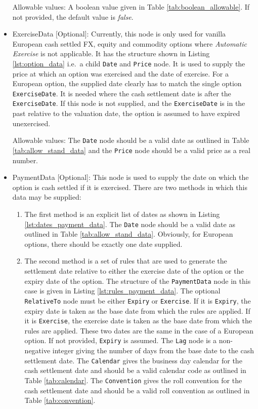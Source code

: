 \begin{itemize}
Allowable values: A boolean value given in Table \ref{tab:boolean_allowable}. If not provided, the default value is \emph{false}.

\item ExerciseData [Optional]: Currently, this node is only used for vanilla European cash settled FX, equity and commodity options where \textit{Automatic Exercise} is not applicable. It has the structure shown in Listing \ref{lst:option_data} i.e.\ a child \lstinline!Date! and \lstinline!Price! node. It is used to supply the price at which an option was exercised and the date of exercise. For a European option, the supplied date clearly has to match the single option \lstinline!ExerciseDate!. It is needed where the cash settlement date is after the \lstinline!ExerciseDate!. If this node is not supplied, and the \lstinline!ExerciseDate! is in the past relative to the valuation date, the option is assumed to have expired unexercised.

Allowable values: The \lstinline!Date! node should be a valid date as outlined in Table \ref{tab:allow_stand_data} and the \lstinline!Price! node should be a valid price as a real number.

\item PaymentData [Optional]:  This node is used to supply the date on which the option is cash settled if it is exercised. There are two methods in which this data may be supplied:

\begin{enumerate}
\item
The first method is an explicit list of dates as shown in Listing \ref{lst:dates_payment_data}. The \lstinline!Date! node should be a valid date as outlined in Table \ref{tab:allow_stand_data}. Obviously, for European options, there should be exactly one date supplied.

\item
The second method is a set of rules that are used to generate the settlement date relative to either the exercise date of the option or the expiry date of the option. The structure of the \lstinline!PaymentData! node in this case is given in Listing \ref{lst:rules_payment_data}. The optional \lstinline!RelativeTo! node must be either \lstinline!Expiry! or \lstinline!Exercise!. If it is \lstinline!Expiry!, the expiry date is taken as the base date from which the rules are applied. If it is \lstinline!Exercise!, the exercise date is taken as the base date from which the rules are applied. These two dates are the same in the case of a European option. If not provided, \lstinline!Expiry! is assumed. The \lstinline!Lag! node is a non-negative integer giving the number of days from the base date to the cash settlement date. The \lstinline!Calendar! gives the business day calendar for the cash settlement date and should be a valid calendar code as outlined in Table \ref{tab:calendar}. The \lstinline!Convention! gives the roll convention for the cash settlement date and should be a valid roll convention as outlined in Table \ref{tab:convention}.

\end{enumerate}

\end{itemize}

